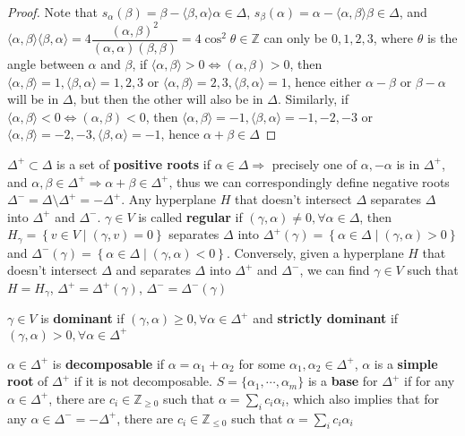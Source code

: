 \documentclass[main]{subfiles}
\begin{document}
\begin{proof}
Note that $s_\alpha(\beta)=\beta-\langle\beta,\alpha\rangle\alpha\in\Delta$, $s_\beta(\alpha)=\alpha-\langle\alpha,\beta\rangle\beta\in\Delta$, and $\langle\alpha,\beta\rangle\langle\beta,\alpha\rangle=4\dfrac{(\alpha,\beta)^2}{(\alpha,\alpha)(\beta,\beta)}=4\cos^2\theta\in\mathbb Z$ can only be $0,1,2,3$, where $\theta$ is the angle between $\alpha$ and $\beta$, if $\langle\alpha,\beta\rangle>0\Leftrightarrow(\alpha,\beta)>0$, then $\langle\alpha,\beta\rangle=1,\langle\beta,\alpha\rangle=1,2,3$ or $\langle\alpha,\beta\rangle=2,3,\langle\beta,\alpha\rangle=1$, hence either $\alpha-\beta$ or $\beta-\alpha$ will be in $\Delta$, but then the other will also be in $\Delta$. Similarly, if $\langle\alpha,\beta\rangle<0\Leftrightarrow(\alpha,\beta)<0$, then $\langle\alpha,\beta\rangle=-1,\langle\beta,\alpha\rangle=-1,-2,-3$ or $\langle\alpha,\beta\rangle=-2,-3,\langle\beta,\alpha\rangle=-1$, hence $\alpha+\beta\in\Delta$
\end{proof}

\begin{definition}
$\Delta^+\subset\Delta$ is a set of \textbf{positive roots} if $\alpha\in\Delta\Rightarrow$ precisely one of $\alpha,-\alpha$ is in $\Delta^+$, and $\alpha,\beta\in\Delta^+\Rightarrow\alpha+\beta\in\Delta^+$, thus we can correspondingly define negative roots $\Delta^-=\Delta\setminus\Delta^+=-\Delta^+$. Any hyperplane $H$ that doesn't intersect $\Delta$ separates $\Delta$ into $\Delta^+$ and $\Delta^-$. $\gamma\in V$ is called \textbf{regular} if $(\gamma,\alpha)\neq0,\forall\alpha\in\Delta$, then $H_\gamma=\left\{v\in V\middle|(\gamma,v)=0\right\}$ separates $\Delta$ into $\Delta^+(\gamma)=\left\{\alpha\in\Delta\middle|(\gamma,\alpha)>0\right\}$ and $\Delta^-(\gamma)=\left\{\alpha\in\Delta\middle|(\gamma,\alpha)<0\right\}$. Conversely, given a hyperplane $H$ that doesn't intersect $\Delta$ and separates $\Delta$ into $\Delta^+$ and $\Delta^-$, we can find $\gamma\in V$ such that $H=H_\gamma$, $\Delta^+=\Delta^+(\gamma)$, $\Delta^-=\Delta^-(\gamma)$ 
\end{definition}

\begin{definition}
$\gamma\in V$ is \textbf{dominant} if $(\gamma,\alpha)\geq0,\forall\alpha\in\Delta^+$ and \textbf{strictly dominant} if $(\gamma,\alpha)>0,\forall\alpha\in\Delta^+$
\end{definition}

\begin{definition}
$\alpha\in\Delta^+$ is \textbf{decomposable} if $\alpha=\alpha_1+\alpha_2$ for some $\alpha_1,\alpha_2\in\Delta^+$, $\alpha$ is a \textbf{simple root} of $\Delta^+$ if it is not decomposable. $S=\{\alpha_1,\cdots,\alpha_m\}$ is a \textbf{base} for $\Delta^+$ if for any $\alpha\in\Delta^+$, there are $c_i\in\mathbb Z_{\geq0}$ such that $\alpha=\displaystyle\sum_{i}c_i\alpha_i$, which also implies that for any $\alpha\in\Delta^-=-\Delta^+$, there are $c_i\in\mathbb Z_{\leq0}$ such that $\alpha=\displaystyle\sum_{i}c_i\alpha_i$
\end{definition}
\end{document}
